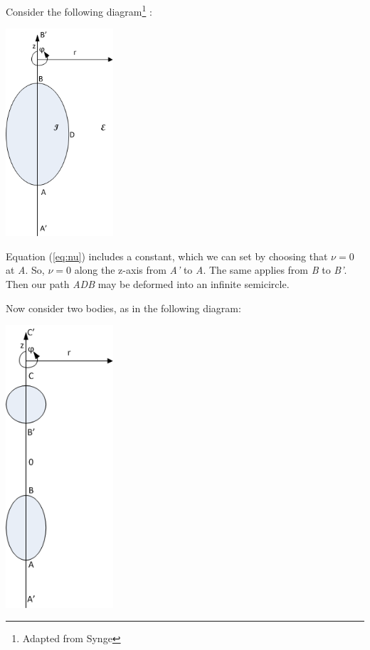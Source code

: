 \documentclass{article}
\begin{document}
Consider the following diagram\footnote{Adapted from Synge} :

\begin{center}
\includegraphics[width=40mm]{Figure1.png}
\end{center}

Equation (\ref{eq:nu}) includes a constant, which we can set by choosing that $\nu=0$ at \emph{A}. So, $\nu=0$ along the z-axis from \emph{A'} to \emph{A}. The same applies from \emph{B} to \emph{B'}. Then our path \emph{ADB} may be deformed into an infinite semicircle.

Now consider two bodies, as in the following diagram:

\begin{center}
\includegraphics[width=40mm]{Figure2.png}
\end{center}
\end{document}
